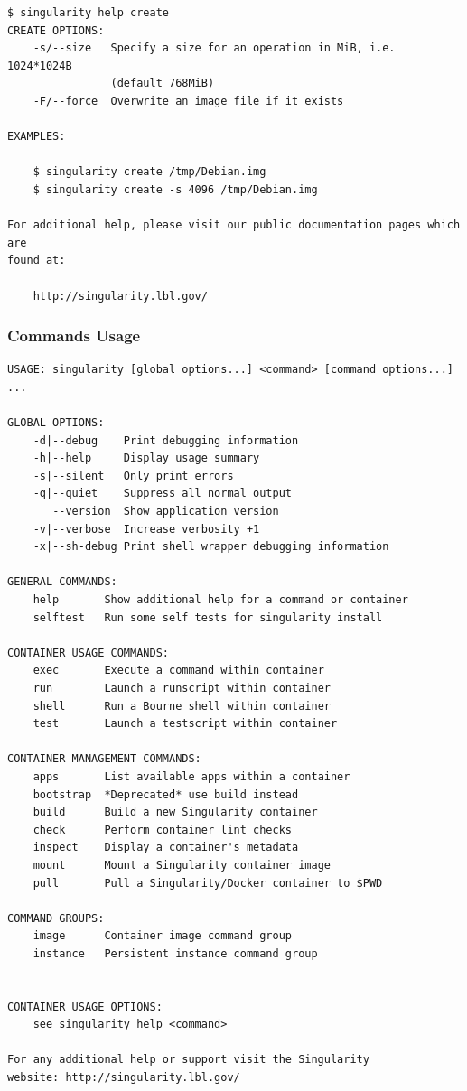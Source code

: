 \documentclass[a4paper]{article}
\begin{document}
\begin{lstlisting}[frame=single]
$ singularity help create
CREATE OPTIONS:
    -s/--size   Specify a size for an operation in MiB, i.e. 1024*1024B
                (default 768MiB)
    -F/--force  Overwrite an image file if it exists

EXAMPLES:

    $ singularity create /tmp/Debian.img
    $ singularity create -s 4096 /tmp/Debian.img

For additional help, please visit our public documentation pages which are
found at:

    http://singularity.lbl.gov/
\end{lstlisting}	
	
\subsubsection{Commands Usage}
\label{sec:commandsusage}

\begin{lstlisting}[frame=single]
USAGE: singularity [global options...] <command> [command options...] ...

GLOBAL OPTIONS:
    -d|--debug    Print debugging information
    -h|--help     Display usage summary
    -s|--silent   Only print errors
    -q|--quiet    Suppress all normal output
       --version  Show application version
    -v|--verbose  Increase verbosity +1
    -x|--sh-debug Print shell wrapper debugging information

GENERAL COMMANDS:
    help       Show additional help for a command or container                  
    selftest   Run some self tests for singularity install                      

CONTAINER USAGE COMMANDS:
    exec       Execute a command within container                               
    run        Launch a runscript within container                              
    shell      Run a Bourne shell within container                              
    test       Launch a testscript within container                             

CONTAINER MANAGEMENT COMMANDS:
    apps       List available apps within a container                           
    bootstrap  *Deprecated* use build instead                                   
    build      Build a new Singularity container                                
    check      Perform container lint checks                                    
    inspect    Display a container's metadata                                   
    mount      Mount a Singularity container image                              
    pull       Pull a Singularity/Docker container to $PWD                      

COMMAND GROUPS:
    image      Container image command group                                    
    instance   Persistent instance command group                                


CONTAINER USAGE OPTIONS:
    see singularity help <command>

For any additional help or support visit the Singularity
website: http://singularity.lbl.gov/
\end{lstlisting}
\end{document}
